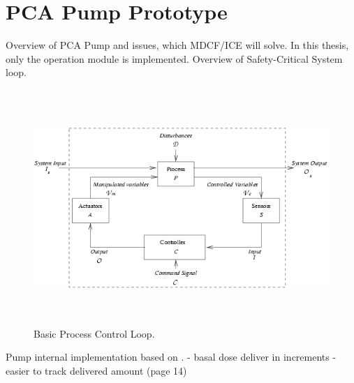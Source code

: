 
\cleardoublepage


\chapter{PCA Pump Prototype}
\label{pcapump}

Overview of PCA Pump and issues, which MDCF/ICE will solve.
In this thesis, only the operation module is implemented.
Overview of Safety-Critical System loop.

\begin{figure}[ht]%
    \begin{center}
    	\includegraphics[height=3.5in]{figures/safety-critical-loop.png}
    	\caption{Basic Process Control Loop\protect\footnotemark.}
    \end{center}
\end{figure}

Pump internal implementation based on \cite{CADD-PrizmAmbulatoryInfusionPump:Online}.
- basal dose deliver in increments - easier to track delivered amount (page 14)


